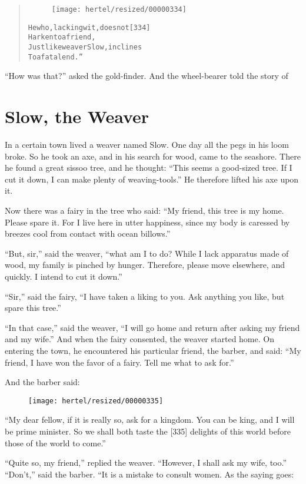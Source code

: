 \documentclass[article, twoside, 10pt]{memoir}
\renewenvironment{verbatim}{%
\begin{quote}%
\vskip -10pt%
\begin{alltt}\normalfont\small}{\end{alltt}%
\end{quote}%
\vskip -10pt
} %
\begin{document}
\begin{verbatim}
\begin{figure}[p]\texttt{[image: hertel/resized/00000334]}\end{figure}He who, lacking wit, does not                           [334]
    Harken to a friend,
Just like weaver Slow, inclines
    To a fatal end.”
\end{verbatim}
``How was that?'' asked the gold-finder. And the wheel-bearer told
the story of

\chapter{Slow, the Weaver}

In a certain town lived a weaver named Slow. One day all the pegs
in his loom broke. So he took an axe, and in his search for wood,
came to the seashore. There he found a great sissoo tree, and he
thought:
``This seems a good-sized tree. If I cut it down, I can make plenty of weaving-tools.''
He therefore lifted his axe upon it.

Now there was a fairy in the tree who said:
``My friend, this tree is my home. Please spare it. For I live here in utter happiness, since my body is caressed by breezes cool from contact with ocean billows.''

``But, sir,'' said the weaver,
``what am I to do? While I lack apparatus made of wood, my family is pinched by hunger. Therefore, please move elsewhere, and quickly. I intend to cut it down.''

``Sir,'' said the fairy,
``I have taken a liking to you. Ask anything you like, but spare this tree.''

``In that case,'' said the weaver,
``I will go home and return after asking my friend and my wife.''
And when the fairy consented, the weaver started home. On entering
the town, he encountered his particular friend, the barber, and
said:
``My friend, I have won the favor of a fairy. Tell me what to ask for.''

And the barber said:
\begin{figure}[p]\texttt{[image: hertel/resized/00000335]}\end{figure}``My dear fellow, if it is really so, ask for a kingdom. You can be king, and I will be prime minister. So we shall both taste the [335] delights of this world before those of the world to come.''

``Quite so, my friend,'' replied the weaver.
``However, I shall ask my wife, too.'' ``Don't,'' said the barber.
“It is a mistake to consult women. As the saying goes:
\end{document}
